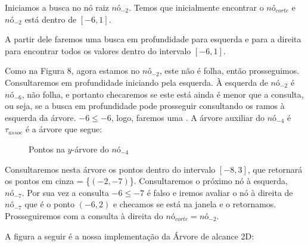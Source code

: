 Iniciamos a busca no nó raiz $nó_{-2}$. Temos que inicialmente encontrar o $nó_{corte}$ e $nó_{-2}$ está dentro de $[-6, 1]$. 


A partir dele faremos uma busca em profundidade para esquerda e para a direita para encontrar todos 
os valores dentro do intervalo $[-6,1]$. 

Como na Figura 8, agora estamos no $nó_{-2}$, este não é folha, então prosseguimos.
Consultaremos em profundidade iniciando pela esquerda. À esquerda de $nó_{-2}$ é $nó_{-6}$, não folha, e portanto checaremos se este está ainda é menor que a consulta, ou seja, se a busca em profundidade pode prosseguir consultando os ramos à esquerda da árvore. $-6 \leq -6$, logo, faremos uma . A árvore auxiliar do $nó_{-4}$ é $\tau_{assoc}$ é a árvore que segue:


\begin{figure}[h]
    \centering
{}
\caption{Pontos na $y$-árvore do $nó_{-4}$}
\end{figure}

Consultaremos nesta árvore os pontos dentro do intervalo $[-8, 3]$, que retornará os pontos em cinza = \{$(-2,-7)$\}.
Consultaremos o próximo nó à esquerda, $nó_{-7}$. Por sua vez a consulta $-6 \leq -7$ é falso e iremos avaliar o nó à direita de $nó_{-7}$ que é o ponto $(-6, 2)$ e checamos se está na janela e o retornamos.
Prosseguiremos com a consulta à direita do $nó_{corte}= nó_{-2}$.

A figura a seguir é a nossa implementação da Árvore de alcance 2D:

